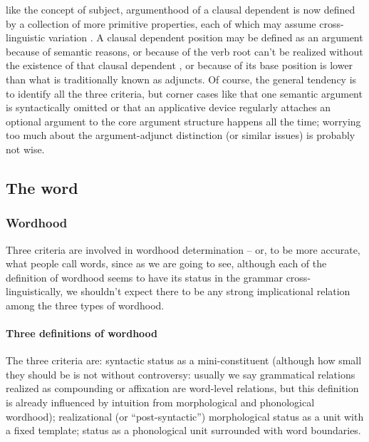 {\begin{itemize}
        like the concept of subject, 
        argumenthood of a clausal dependent 
        is now defined by a collection of more primitive properties, 
        each of which may assume cross-linguistic variation
        \citep{mcinnerney2022argument}.
        A clausal dependent position may be defined as an argument 
        because of semantic reasons,
        or because of the verb root can't be realized 
        without the existence of that clausal dependent
        \citep[]{siddiqi2009syntax},
        or because of its base position is lower than what is traditionally 
        known as adjuncts.
        Of course, the general tendency is to identify all the three criteria,
        but corner cases like 
        that one semantic argument is syntactically omitted
        or that an applicative device regularly
        attaches an optional argument to the core argument structure
        happens all the time; 
        worrying too much about the argument-adjunct distinction 
        (or similar issues) is probably not wise.
\end{itemize}

\subsection{The word}

\subsubsection{Wordhood}

Three criteria are involved in wordhood determination -- 
or, to be more accurate, what people call words,
since as we are going to see, 
although each of the definition of wordhood 
seems to have its status in the grammar cross-linguistically,
we shouldn't expect there to be any strong implicational relation 
among the three types of wordhood.

\paragraph{Three definitions of wordhood} The three criteria are: 
syntactic status as a mini-constituent 
(although how small they should be is not without controversy: 
usually we say grammatical relations realized as compounding or affixation 
are word-level relations, 
but this definition is already influenced by 
intuition from morphological and phonological wordhood);
realizational (or ``post-syntactic'') morphological  status 
as a unit with a fixed template;
status as a phonological unit surrounded with word boundaries.

}
